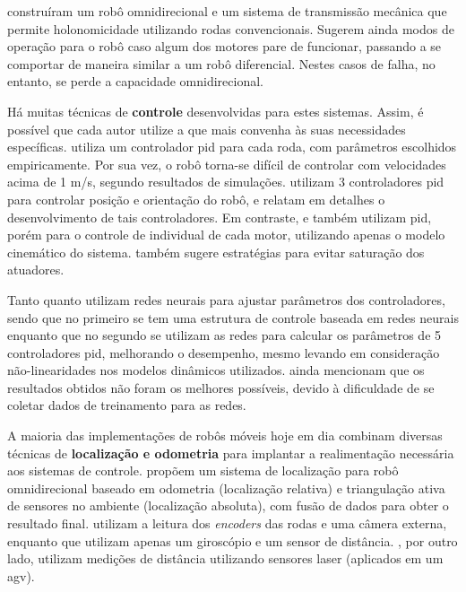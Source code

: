 \citet{jung2001fault} construíram um robô omnidirecional e um sistema de transmissão mecânica que permite holonomicidade utilizando rodas convencionais. Sugerem ainda modos de operação para o robô caso algum dos motores pare de funcionar, passando a se comportar de maneira similar a um robô diferencial. Nestes casos de falha, no entanto, se perde a capacidade omnidirecional.

Há muitas técnicas de \textbf{controle} desenvolvidas para estes sistemas. Assim, é possível que cada autor utilize a que mais convenha às suas necessidades específicas. \citet{ritter2016modelagem} utiliza um controlador \acrshort{pid} para cada roda, com parâmetros escolhidos empiricamente. Por sua vez, o robô torna-se difícil de controlar com velocidades acima de 1 m/s, segundo resultados de s\acrshort{imu}lações. \citet{samani2007comprehensive} utilizam 3 controladores \acrshort{pid} para controlar posição e orientação do robô, e relatam em detalhes o desenvolvimento de tais controladores. Em contraste, \citet{rojas2006holonomic} e \citet{indiveri2009swedish} também utilizam \acrshort{pid}, porém para o controle de individual de cada motor, utilizando apenas o modelo cinemático do sistema. \citet{indiveri2009swedish} também sugere estratégias para evitar saturação dos atuadores.

Tanto \citet{treesatayapun2011discrete} quanto \citet{oubbati2005velocity} utilizam redes neurais para ajustar parâmetros dos controladores, sendo que no primeiro se tem uma estrutura de controle baseada em redes neurais enquanto que no segundo se utilizam as redes para calcular os parâmetros de 5 controladores \acrshort{pid}, melhorando o desempenho, mesmo levando em consideração não-linearidades nos modelos dinâmicos utilizados. \citet{oubbati2005velocity} ainda mencionam que os resultados obtidos não foram os melhores possíveis, devido à dificuldade de se coletar dados de treinamento para as redes.

A maioria das implementações de robôs móveis hoje em dia combinam diversas técnicas de \textbf{localização e odometria} para implantar a realimentação necessária aos sistemas de controle. \citet{ginzburg2013indoor} propõem um sistema de localização para robô omnidirecional baseado em odometria (localização relativa) e triangulação ativa de sensores no ambiente (localização absoluta), com fusão de dados para obter o resultado final. \citet{rojas2006holonomic} utilizam a leitura dos \emph{encoders} das rodas e uma câmera externa, enquanto que \citet{garcia2015gyro} utilizam apenas um giroscópio e um sensor de distância. \citet{rohrig2010laser}, por outro lado, utilizam medições de distância utilizando sensores laser (aplicados em um \acrshort{agv}).

